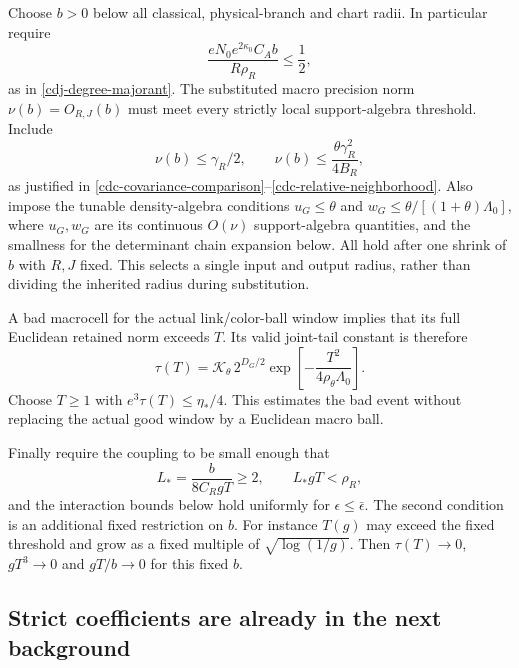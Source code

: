 \documentclass[11pt]{article}
\theoremstyle{remark}
\begin{document}
Choose $b>0$ below all classical, physical-branch and chart
radii. In particular require
\begin{equation}
 \frac{eN_0e^{2\kappa_0}C_A b}{R\rho_R}\le\frac12,
 \label{cdm-joint-domain}
\end{equation}
as in \eqref{cdj-degree-majorant}. The substituted macro
precision norm $\nu(b)=O_{R,J}(b)$ must meet every strictly
local support-algebra threshold. Include
\begin{equation}
 \nu(b)\le\gamma_R/2,\qquad
 \nu(b)\le\frac{\theta\gamma_R^2}{4B_R},
 \label{cdm-precision-small}
\end{equation}
as justified in
\eqref{cdc-covariance-comparison}--\eqref{cdc-relative-neighborhood}.
Also impose the tunable density-algebra conditions
$u_G\le\theta$ and
$w_G\le\theta/[(1+\theta)\Lambda_0]$, where $u_G,w_G$
are its continuous $O(\nu)$ support-algebra quantities, and
the smallness for the determinant chain expansion below.
All hold after one shrink of $b$ with $R,J$ fixed.
This selects a single input and output radius, rather than
dividing the inherited radius during substitution.

A bad macrocell for the actual link/color-ball window implies
that its full Euclidean retained norm exceeds $T$. Its valid
joint-tail constant is therefore
\begin{equation}
 \tau(T)=\mathcal K_\theta\,2^{D_G/2}
       \exp\left[-\frac{T^2}{4\rho_\theta\Lambda_0}\right].
 \label{cdm-tail-constant}
\end{equation}
Choose $T\ge1$ with $e^3\tau(T)\le\eta_*/4$.
This estimates the bad event without replacing the actual
good window by a Euclidean macro ball.

Finally require the coupling to be small enough that
\begin{equation}
 L_*=\frac{b}{8C_RgT}\ge2,\qquad L_*gT<\rho_R,
 \label{cdm-lambda-radius}
\end{equation}
and the interaction bounds below hold uniformly for
$\epsilon\le\bar\epsilon$. The second condition is an
additional fixed restriction on $b$. For instance $T(g)$
may exceed the fixed threshold and grow as a fixed multiple
of $\sqrt{\log(1/g)}$. Then $\tau(T)\to0$, $gT^3\to0$ and
$gT/b\to0$ for this fixed $b$.

\subsection{Strict coefficients are already in the next background}
\label{cdm-support-section}
\end{document}
